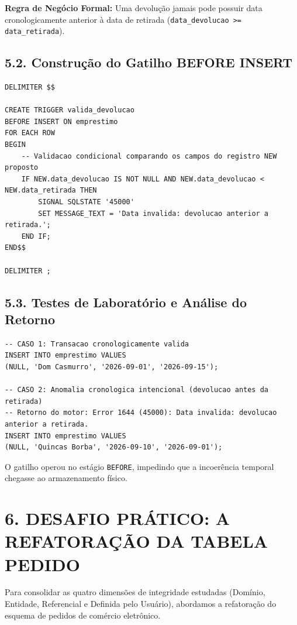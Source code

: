 \textbf{Regra de Negócio Formal:} Uma devolução jamais pode possuir data cronologicamente anterior à data de retirada (\texttt{data\_devolucao >= data\_retirada}).

\subsection*{5.2. Construção do Gatilho BEFORE INSERT}

\begin{lstlisting}
DELIMITER $$

CREATE TRIGGER valida_devolucao
BEFORE INSERT ON emprestimo
FOR EACH ROW
BEGIN
    -- Validacao condicional comparando os campos do registro NEW proposto
    IF NEW.data_devolucao IS NOT NULL AND NEW.data_devolucao < NEW.data_retirada THEN
        SIGNAL SQLSTATE '45000'
        SET MESSAGE_TEXT = 'Data invalida: devolucao anterior a retirada.';
    END IF;
END$$

DELIMITER ;
\end{lstlisting}

\subsection*{5.3. Testes de Laboratório e Análise do Retorno}

\begin{lstlisting}
-- CASO 1: Transacao cronologicamente valida
INSERT INTO emprestimo VALUES
(NULL, 'Dom Casmurro', '2026-09-01', '2026-09-15');

-- CASO 2: Anomalia cronologica intencional (devolucao antes da retirada)
-- Retorno do motor: Error 1644 (45000): Data invalida: devolucao anterior a retirada.
INSERT INTO emprestimo VALUES
(NULL, 'Quincas Borba', '2026-09-10', '2026-09-01');
\end{lstlisting}

O gatilho operou no estágio \texttt{BEFORE}, impedindo que a incoerência temporal chegasse ao armazenamento físico.

\newpage

\section*{6. DESAFIO PRÁTICO: A REFATORAÇÃO DA TABELA PEDIDO}

Para consolidar as quatro dimensões de integridade estudadas (Domínio, Entidade, Referencial e Definida pelo Usuário), abordamos a refatoração do esquema de pedidos de comércio eletrônico.

